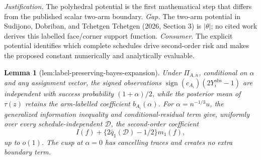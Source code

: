 \documentclass{article}
\newtheorem{lemma}{Lemma}
\begin{document}
\par\smallskip\noindent \textit{Justification.} The polyhedral potential is the first mathematical step that differs from the published scalar two-arm boundary. \textit{Gap.} The two-arm potential in Sudijono, Dobriban, and Tchetgen Tchetgen (2026, Section 3) is \(|\theta|\); no cited work derives this labelled face/corner support function. \textit{Consumer.} The explicit potential identifies which complete schedules drive second-order risk and makes the proposed constant numerically and analytically evaluable.

\begin{lemma}[lem:label-preserving-bayes-expansion]\label{lem:label-preserving-bayes-expansion}
Under \(\Pi_{A,n}\), conditional on \(\alpha\) and any assignment vector, the signed observations \(\operatorname{sign}(c_{A_i})(2Y_i^{\mathrm{obs}}-1)\) are independent with success probability \((1+\alpha)/2\), while the posterior mean of \(\tau(z)\) retains the arm-labelled coefficient \(b_{A_i}(\alpha)\). For \(\alpha=n^{-1/3}u\), the generalized information inequality and conditional-residual term give, uniformly over every schedule-independent \(\mathcal D\), the second-order coefficient \[I(f)+\{2\bar q_1(\mathcal D)-1/2\}m_1(f),\] up to \(o(1)\). The cusp at \(\alpha=0\) has cancelling traces and creates no extra boundary term.
\end{lemma}
\end{document}
